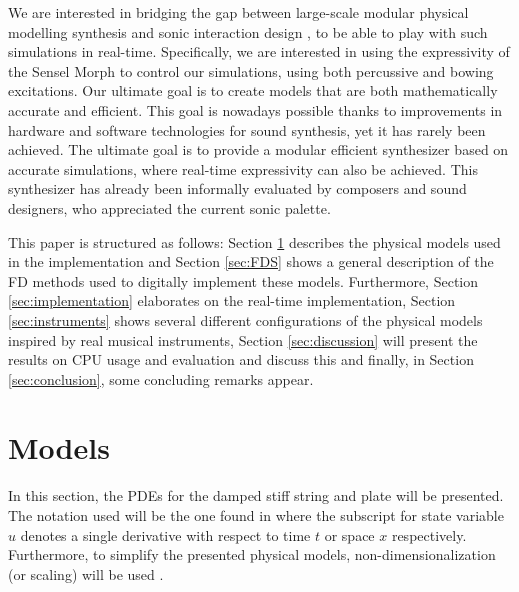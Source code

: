 We are interested in bridging the gap between large-scale modular physical modelling synthesis and sonic interaction design \cite{franinovic2013sonic}, to be able to play with such simulations in real-time. Specifically, we are interested in using the expressivity of the Sensel Morph \cite{sensel2018} to control our simulations, using both percussive and bowing excitations. Our ultimate goal is to create models that are both mathematically accurate and efficient. This goal is nowadays possible thanks to improvements in hardware and software technologies for sound synthesis, yet it has rarely been achieved. The ultimate goal is to provide a modular efficient synthesizer based on accurate simulations, where real-time expressivity can also be achieved. This synthesizer has already been informally evaluated by composers and sound designers, who appreciated the current sonic palette.


This paper is structured as follows: Section \ref{sec:PDE} describes the physical models used in the implementation and Section \ref{sec:FDS} shows a general description of the FD methods used to digitally implement these models. Furthermore, Section \ref{sec:implementation} elaborates on the real-time implementation, Section \ref{sec:instruments} shows several different configurations of the physical models inspired by real musical instruments, Section \ref{sec:discussion} will present the results on CPU usage and evaluation and discuss this and finally, in Section \ref{sec:conclusion}, some concluding remarks appear.

\section{Models}\label{sec:PDE}
In this section, the PDEs for the damped stiff string and plate will be presented. The notation used will be the one found in \cite{Bilbao2009:NumericalSoundSynthesis} where the subscript for state variable $u$ denotes a single derivative with respect to time $t$ or space $x$ respectively. Furthermore, to simplify the presented physical models, non-dimensionalization (or scaling) will be used \cite{Bilbao2009:NumericalSoundSynthesis}. 


